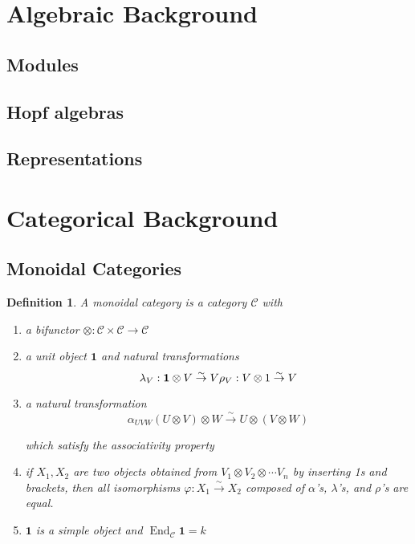 \documentclass[]{article}
\newtheorem{defn}{Definition}
\newcommand{\isomto}{\overset{\sim}{\rightarrow}}
\newcommand{\End}{\operatorname{End}}
\begin{document}
\tableofcontents
\section{Algebraic Background}
\subsection{Modules}
\subsection{Hopf algebras}
\subsection{Representations}

\section{Categorical Background}
\subsection{Monoidal Categories}
\begin{defn}
    A \emph{monoidal category} is a category $\mathcal{C}$ with 
    \begin{enumerate}
    \renewcommand{\labelenumi}{(\roman{enumi})}
        \item a bifunctor $\otimes: \mathcal{C} \times \mathcal{C} \to
            \mathcal{C}$
        \item a unit object $\mathbf{1}$ and natural transformations
            \begin{equation}
                \lambda_V : \mathbf{1} \otimes V \isomto V \\
                \rho_V : V \otimes 1 \isomto V
            \end{equation}
        \item a natural transformation 
            \begin{equation}
                \alpha_{UVW} (U \otimes V) \otimes W \isomto U \otimes (V \otimes W)
            \end{equation}

            which satisfy the associativity property 

        \item if $X_1, X_2$ are two objects obtained from $V_1 \otimes V_2 \otimes \cdots V_n$ by inserting 1s and brackets, then all isomorphisms $\varphi: X_1 \isomto X_2$ composed of $\alpha$'s, $\lambda$'s, and $\rho$'s are equal. 
        \item $\mathbf{1}$ is a simple object and $\End_\mathcal{C} \mathbf{1} = k$
    \end{enumerate}

\end{defn}
\end{document}
